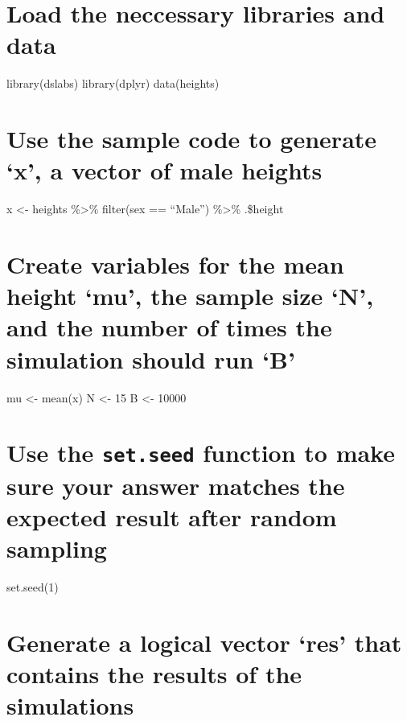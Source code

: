 \documentclass[
]{article}
\begin{document}
\hypertarget{load-the-neccessary-libraries-and-data}{%
\section{Load the neccessary libraries and
data}\label{load-the-neccessary-libraries-and-data}}

library(dslabs) library(dplyr) data(heights)

\hypertarget{use-the-sample-code-to-generate-x-a-vector-of-male-heights}{%
\section{Use the sample code to generate `x', a vector of male
heights}\label{use-the-sample-code-to-generate-x-a-vector-of-male-heights}}

x \textless- heights \%\textgreater\% filter(sex == ``Male'')
\%\textgreater\% .\$height

\hypertarget{create-variables-for-the-mean-height-mu-the-sample-size-n-and-the-number-of-times-the-simulation-should-run-b}{%
\section{Create variables for the mean height `mu', the sample size `N',
and the number of times the simulation should run
`B'}\label{create-variables-for-the-mean-height-mu-the-sample-size-n-and-the-number-of-times-the-simulation-should-run-b}}

mu \textless- mean(x) N \textless- 15 B \textless- 10000

\hypertarget{use-the-set.seed-function-to-make-sure-your-answer-matches-the-expected-result-after-random-sampling}{%
\section{\texorpdfstring{Use the \texttt{set.seed} function to make sure
your answer matches the expected result after random
sampling}{Use the set.seed function to make sure your answer matches the expected result after random sampling}}\label{use-the-set.seed-function-to-make-sure-your-answer-matches-the-expected-result-after-random-sampling}}

set.seed(1)

\hypertarget{generate-a-logical-vector-res-that-contains-the-results-of-the-simulations}{%
\section{Generate a logical vector `res' that contains the results of
the
simulations}\label{generate-a-logical-vector-res-that-contains-the-results-of-the-simulations}}
\end{document}
